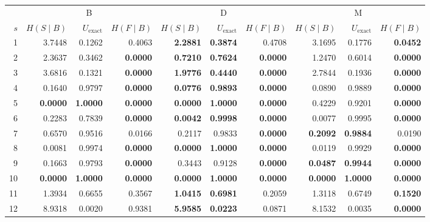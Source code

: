 \begin{table}[ht]
\centering
\scriptsize
\setlength{\tabcolsep}{4pt}
\begin{tabular}{r rrr rrr rrr}
\toprule
& \multicolumn{3}{c}{B} & \multicolumn{3}{c}{D} & \multicolumn{3}{c}{M} \\
\cmidrule(lr){2-4}\cmidrule(lr){5-7}\cmidrule(lr){8-10}
$s$ & $H(S \mid B)$ & $U_{\mathrm{exact}}$ & $H(F \mid B)$ & $H(S \mid B)$ & $U_{\mathrm{exact}}$ & $H(F \mid B)$ & $H(S \mid B)$ & $U_{\mathrm{exact}}$ & $H(F \mid B)$ \\
\midrule
1 & 3.7448 & 0.1262 & 0.4063 & \textbf{2.2881} & \textbf{0.3874} & 0.4708 & 3.1695 & 0.1776 & \textbf{0.0452} \\
2 & 2.3637 & 0.3462 & \textbf{0.0000} & \textbf{0.7210} & \textbf{0.7624} & \textbf{0.0000} & 1.2470 & 0.6014 & \textbf{0.0000} \\
3 & 3.6816 & 0.1321 & \textbf{0.0000} & \textbf{1.9776} & \textbf{0.4440} & \textbf{0.0000} & 2.7844 & 0.1936 & \textbf{0.0000} \\
4 & 0.1640 & 0.9797 & \textbf{0.0000} & \textbf{0.0776} & \textbf{0.9893} & \textbf{0.0000} & 0.0890 & 0.9889 & \textbf{0.0000} \\
5 & \textbf{0.0000} & \textbf{1.0000} & \textbf{0.0000} & \textbf{0.0000} & \textbf{1.0000} & \textbf{0.0000} & 0.4229 & 0.9201 & \textbf{0.0000} \\
6 & 0.2283 & 0.7839 & \textbf{0.0000} & \textbf{0.0042} & \textbf{0.9998} & \textbf{0.0000} & 0.0077 & 0.9995 & \textbf{0.0000} \\
7 & 0.6570 & 0.9516 & 0.0166 & 0.2117 & 0.9833 & \textbf{0.0000} & \textbf{0.2092} & \textbf{0.9884} & 0.0190 \\
8 & 0.0081 & 0.9974 & \textbf{0.0000} & \textbf{0.0000} & \textbf{1.0000} & \textbf{0.0000} & 0.0119 & 0.9929 & \textbf{0.0000} \\
9 & 0.1663 & 0.9793 & \textbf{0.0000} & 0.3443 & 0.9128 & \textbf{0.0000} & \textbf{0.0487} & \textbf{0.9944} & \textbf{0.0000} \\
10 & \textbf{0.0000} & \textbf{1.0000} & \textbf{0.0000} & \textbf{0.0000} & \textbf{1.0000} & \textbf{0.0000} & \textbf{0.0000} & \textbf{1.0000} & \textbf{0.0000} \\
11 & 1.3934 & 0.6655 & 0.3567 & \textbf{1.0415} & \textbf{0.6981} & 0.2059 & 1.3118 & 0.6749 & \textbf{0.1520} \\
12 & 8.9318 & 0.0020 & 0.9381 & \textbf{5.9585} & \textbf{0.0223} & 0.0871 & 8.1532 & 0.0035 & \textbf{0.0000} \\

\end{tabular}
\end{table}
